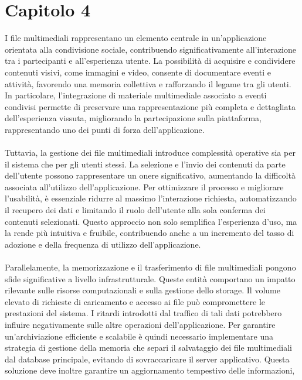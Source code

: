\chapter{Capitolo 4}

I file multimediali rappresentano un elemento centrale 
in un'applicazione orientata alla condivisione sociale,
contribuendo significativamente all'interazione tra i partecipanti e all'esperienza utente.
La possibilità di acquisire e condividere contenuti visivi, come immagini e video, 
consente di documentare eventi e attività,
favorendo una memoria collettiva e rafforzando il legame tra gli utenti.
In particolare, l'integrazione di materiale multimediale associato a eventi condivisi 
permette di preservare una rappresentazione più completa e dettagliata dell'esperienza vissuta,
migliorando la partecipazione sulla piattaforma, 
rappresentando uno dei punti di forza dell'applicazione.\\
\\
Tuttavia, la gestione dei file multimediali introduce complessità operative 
sia per il sistema che per gli utenti stessi.
La selezione e l'invio dei contenuti da parte dell'utente
possono rappresentare un onere significativo, 
aumentando la difficoltà associata all'utilizzo dell'applicazione.
Per ottimizzare il processo e migliorare l'usabilità, 
è essenziale ridurre al massimo l'interazione richiesta,
automatizzando il recupero dei dati e limitando il ruolo dell'utente 
alla sola conferma dei contenuti selezionati.
Questo approccio non solo semplifica l'esperienza d'uso, 
ma la rende più intuitiva e fruibile,
contribuendo anche a un incremento del tasso di adozione e
della frequenza di utilizzo dell'applicazione.\\
\\
Parallelamente, la memorizzazione e il trasferimento di file multimediali 
pongono sfide significative a livello infrastrutturale.
Queste entità comportano un impatto rilevante
sulle risorse computazionali e sulla gestione dello storage.
Il volume elevato di richieste di caricamento e accesso ai file 
può compromettere le prestazioni del sistema.
I ritardi introdotti dal traffico di tali dati 
potrebbero influire negativamente sulle altre operazioni dell'applicazione.
Per garantire un'archiviazione efficiente e scalabile 
è quindi necessario implementare una strategia di gestione della memoria
che separi il salvataggio dei file multimediali dal database principale, 
evitando di sovraccaricare il server applicativo.
Questa soluzione deve inoltre garantire un aggiornamento tempestivo delle informazioni, 
